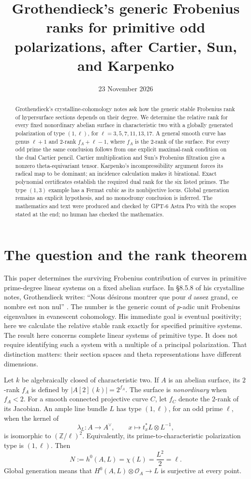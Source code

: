 \documentclass[11pt]{article}
\title{Grothendieck's generic Frobenius ranks for primitive odd polarizations, after Cartier, Sun, and Karpenko}
\author{}
\date{23 November 2026}
\theoremstyle{definition}\newtheorem{definition}[theorem]{Definition}
\theoremstyle{remark}\newtheorem{remark}[theorem]{Remark}
\newcommand{\OO}{\mathcal O}
\begin{document}
\maketitle
\begin{abstract}
Grothendieck's crystalline-cohomology notes ask how the generic stable Frobenius rank of hypersurface sections depends on their degree. We determine the relative rank for every fixed nonordinary abelian surface in characteristic two with a globally generated polarization of type $(1,\ell)$, for $\ell=3,5,7,11,13,17$. A general smooth curve has genus $\ell+1$ and $2$-rank $f_A+\ell-1$, where $f_A$ is the $2$-rank of the surface. For every odd prime the same conclusion follows from one explicit maximal-rank condition on the dual Cartier pencil. Cartier multiplication and Sun's Frobenius filtration give a nonzero theta-equivariant tensor. Karpenko's incompressibility argument forces its radical map to be dominant; an incidence calculation makes it birational. Exact polynomial certificates establish the required dual rank for the six listed primes. The type $(1,3)$ example has a Fermat cubic as its nonbijective locus. Global generation remains an explicit hypothesis, and no monodromy conclusion is inferred. The mathematics and text were produced and checked by GPT-6 Astra Pro with the scopes stated at the end; no human has checked the mathematics.
\end{abstract}

\section{The question and the rank theorem}

This paper determines the surviving Frobenius contribution of curves in primitive prime-degree linear systems on a fixed abelian surface. In \S8.5.8 of his crystalline notes, Grothendieck writes: ``Nous d\'esirons montrer que pour $d$ assez grand, ce nombre est non nul'' \citep[cote~4, archive sheets~7--8, PDF images~8--9]{Grothendieck}. The number is the generic count of $p$-adic unit Frobenius eigenvalues in evanescent cohomology. His immediate goal is eventual positivity; here we calculate the relative stable rank exactly for specified primitive systems. The result here concerns complete linear systems of primitive type. It does not require identifying such a system with a multiple of a principal polarization. That distinction matters: their section spaces and theta representations have different dimensions.

Let $k$ be algebraically closed of characteristic two. If $A$ is an abelian surface, its $2$-rank $f_A$ is defined by $|A[2](k)|=2^{f_A}$. The surface is \emph{nonordinary} when $f_A<2$. For a smooth connected projective curve $C$, let $f_C$ denote the $2$-rank of its Jacobian. An ample line bundle $L$ has type $(1,\ell)$, for an odd prime $\ell$, when the kernel of
\[
 \lambda_L:A\longrightarrow A^\vee,\qquad
 x\longmapsto t_x^*L\otimes L^{-1},
\]
is isomorphic to $(\mathbb Z/\ell)^2$. Equivalently, its prime-to-characteristic polarization type is $(1,\ell)$. Then
\[
 N:=h^0(A,L)=\chi(L)=\frac{L^2}{2}=\ell.
\]
Global generation means that $H^0(A,L)\otimes\OO_A\to L$ is surjective at every point.
\end{document}
